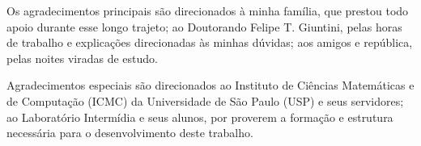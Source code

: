 Os agradecimentos principais são direcionados à minha família, que prestou todo apoio durante esse longo trajeto; ao Doutorando Felipe T. Giuntini, pelas horas de trabalho e explicações direcionadas às minhas dúvidas; aos amigos e república, pelas noites viradas de estudo.
%

Agradecimentos especiais são direcionados ao Instituto de Ciências Matemáticas e de Computação (ICMC) da Universidade de São Paulo (USP) e seus servidores; ao Laboratório Intermídia e seus alunos, por proverem a formação e estrutura necessária para o desenvolvimento deste trabalho.

